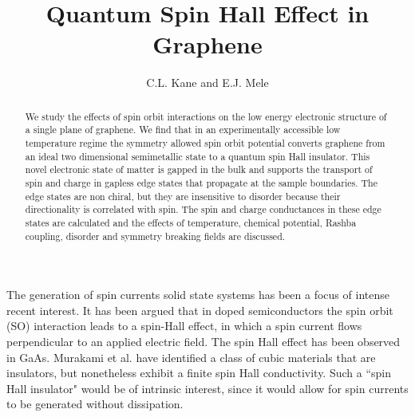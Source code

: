 \documentclass[twocolumn,showpacs,floatfix,prl]{revtex4}
\begin{document}
\title{Quantum Spin Hall Effect in Graphene}

\author{C.L. Kane and E.J. Mele}

\begin{abstract}
We study the effects of spin orbit interactions on the low energy
electronic structure of a single plane of graphene. We find that in an
experimentally accessible low temperature regime the symmetry allowed spin
orbit potential converts graphene from an ideal two dimensional
semimetallic state to a quantum spin Hall insulator. This novel  electronic state of
matter is gapped in the bulk and supports the  transport of spin
and charge in gapless
edge states that propagate at the sample boundaries.
The edge states are non chiral, but they are insensitive to disorder
because their directionality is correlated with spin.
The spin and charge
conductances in these edge states are calculated and the effects of
temperature, chemical potential, Rashba coupling, disorder and symmetry breaking
fields are discussed.
\end{abstract}

\maketitle

The generation of  spin currents solid state systems has been a
focus of intense recent interest.  It has been argued that in
doped semiconductors the spin orbit (SO) interaction leads to a
spin-Hall effect\cite{murakami1,sinova}, in which a spin current
flows perpendicular to an applied electric field.
The spin Hall effect has been observed in
GaAs\cite{kato,otherexpt}.
Murakami et
al. \cite{murakami2} have identified a  class of cubic materials
that are insulators, but nonetheless exhibit a finite spin
Hall conductivity.   Such a ``spin Hall insulator"
would be of intrinsic interest, since it would allow for spin
currents to be generated without dissipation.
\end{document}
